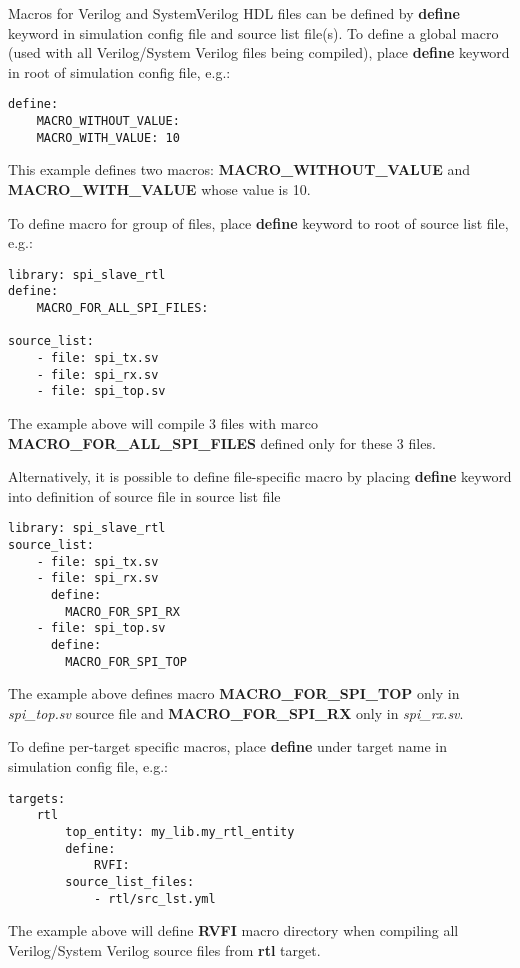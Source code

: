 \documentclass{tropic_design_spec}
\begin{document}
Macros for Verilog and SystemVerilog HDL files can be defined by \textbf{define} keyword
in simulation config file and source list file(s). To define a global macro (used with
all Verilog/System Verilog files being compiled), place \textbf{define} keyword in root
of simulation config file, e.g.:

\begin{lstlisting}
define:
    MACRO_WITHOUT_VALUE:
    MACRO_WITH_VALUE: 10
\end{lstlisting}

This example defines two macros: \textbf{MACRO_WITHOUT_VALUE} and \textbf{MACRO_WITH_VALUE}
whose value is 10. 

To define macro for group of files, place \textbf{define} keyword to root of source list file, e.g.:

\begin{lstlisting}
library: spi_slave_rtl
define:
    MACRO_FOR_ALL_SPI_FILES:

source_list:
    - file: spi_tx.sv
    - file: spi_rx.sv
    - file: spi_top.sv
\end{lstlisting}

The example above will compile 3 files with marco \textbf{MACRO_FOR_ALL_SPI_FILES} defined
only for these 3 files.

Alternatively, it is possible to define file-specific macro by placing \textbf{define}
keyword into definition of source file in source list file

\begin{lstlisting}
library: spi_slave_rtl
source_list:
    - file: spi_tx.sv
    - file: spi_rx.sv
      define:
        MACRO_FOR_SPI_RX
    - file: spi_top.sv
      define:
        MACRO_FOR_SPI_TOP
\end{lstlisting}

The example above defines macro \textbf{MACRO_FOR_SPI_TOP} only in \textit{spi_top.sv}
source file and \textbf{MACRO_FOR_SPI_RX} only in \textit{spi_rx.sv}.

To define per-target specific macros, place \textbf{define} under
target name in simulation config file, e.g.:

\begin{lstlisting}
targets:
    rtl
        top_entity: my_lib.my_rtl_entity
        define:
            RVFI:
        source_list_files:
            - rtl/src_lst.yml
\end{lstlisting}

The example above will define \textbf{RVFI} macro directory when
compiling all Verilog/System Verilog source files from \textbf{rtl} target.
\end{document}
